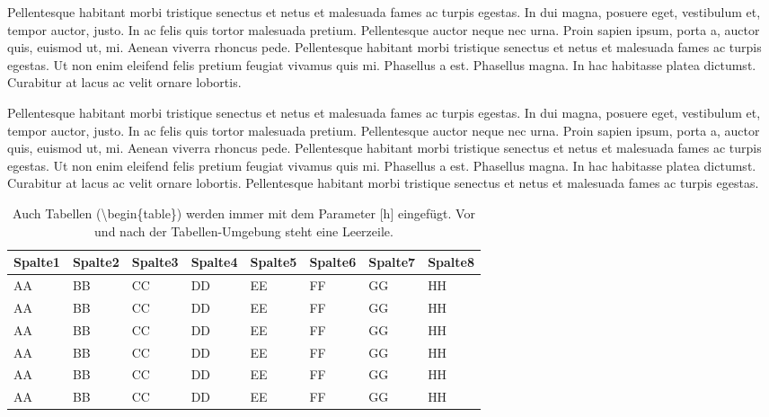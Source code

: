Pellentesque habitant morbi tristique senectus et netus et malesuada fames ac turpis egestas. In dui magna, posuere eget, vestibulum et, tempor auctor, justo. In ac felis quis tortor malesuada pretium. Pellentesque auctor neque nec urna. Proin sapien ipsum, porta a, auctor quis, euismod ut, mi. Aenean viverra rhoncus pede. Pellentesque habitant morbi tristique senectus et netus et malesuada fames ac turpis egestas. Ut non enim eleifend felis pretium feugiat vivamus quis mi. Phasellus a est. Phasellus magna. In hac habitasse platea dictumst. Curabitur at lacus ac velit ornare lobortis.

Pellentesque habitant morbi tristique senectus et netus et malesuada fames ac turpis egestas. In dui magna, posuere eget, vestibulum et, tempor auctor, justo. In ac felis quis tortor malesuada pretium. Pellentesque auctor neque nec urna. Proin sapien ipsum, porta a, auctor quis, euismod ut, mi. Aenean viverra rhoncus pede. Pellentesque habitant morbi tristique senectus et netus et malesuada fames ac turpis egestas. Ut non enim eleifend felis pretium feugiat vivamus quis mi. Phasellus a est. Phasellus magna. In hac habitasse platea dictumst. Curabitur at lacus ac velit ornare lobortis. Pellentesque habitant morbi tristique senectus et netus et malesuada fames ac turpis egestas.


\begin{table}[h] %
	\caption{Auch Tabellen (\glqq \textbackslash begin\{table\}\grqq{}) werden immer mit dem Parameter [h] eingefügt. Vor und nach der Tabellen-Umgebung steht eine Leerzeile.}
	\begin{tabularx}{\textwidth}{XXXXXXXX} \toprule
		Spalte1 & Spalte2 & Spalte3 & Spalte4 & Spalte5
		& Spalte6 & Spalte7 & Spalte8 \\ \midrule
		AA      & BB      & CC      & DD      &
		EE      & FF      & GG      & HH       \\
		AA      & BB      & CC      & DD
		& EE      & FF      & GG      & HH    \\
		AA      & BB      & CC      & DD
		& EE      & FF      & GG      & HH    \\
		AA      & BB      & CC      & DD
		& EE      & FF      & GG      & HH    \\
		AA      & BB      & CC      & DD
		& EE      & FF      & GG      & HH    \\
		AA      & BB      & CC      & DD
		& EE      & FF      & GG      & HH     \\ \bottomrule
	\end{tabularx}
\end{table}

